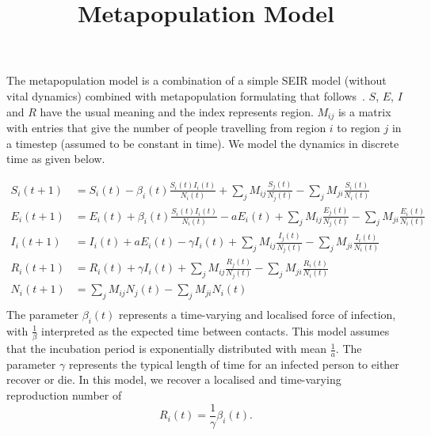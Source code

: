 \documentclass[10pt]{article}
\title{Metapopulation Model}
\begin{document}
\maketitle

The metapopulation model is a combination of a simple SEIR model (without vital dynamics)
combined with metapopulation formulating that follows~\cite{Li489}.
$S$, $E$, $I$ and $R$ have the usual meaning and the index represents region.
$M_{ij}$ is a matrix with entries that give the number of people travelling from region $i$ 
to region $j$ in a timestep (assumed to be constant in time).
We model the dynamics in discrete time as given below.

\begin{align*}
    S_i(t+1) &= S_i(t) -\beta_i(t)  \frac{S_i(t) I_i(t)}{N_i(t)} + \sum_{j} M_{ij} \frac{S_j(t)}{N_j(t)} - \sum_{j} M_{ji} \frac{S_i(t)}{N_i(t)}\\
    E_i(t+1) &= E_i(t) +\beta_i(t)  \frac{S_i(t) I_i(t) }{N_i(t)} - a E_i(t) + \sum_{j} M_{ij} \frac{E_j(t)}{N_j(t)} - \sum_{j} M_{ji} \frac{E_i(t)}{N_i(t)}\\
    I_i(t+1) &= I_i(t) + a E_i(t) - \gamma I_i(t) + \sum_{j} M_{ij} \frac{I_j(t)}{N_j(t)} - \sum_{j} M_{ji} \frac{I_i(t)}{N_i(t)}\\
    R_i(t+1) &= R_i(t) + \gamma I_i(t) + \sum_{j} M_{ij} \frac{R_j(t)}{N_j(t)} - \sum_{j} M_{ji} \frac{R_i(t)}{N_i(t)}\\
    N_i(t+1) &=  \sum_{j} M_{ij} N_j(t) - \sum_{j} M_{ji} N_i(t)\\
\end{align*}
The parameter $\beta_i(t)$ represents a time-varying and localised force of infection,
with $\frac{1}{\beta}$ interpreted as the expected time between contacts.
This model assumes that the incubation period is exponentially distributed
with mean $\frac{1}{a}$.
The parameter $\gamma$ represents the typical length of time for an infected person to 
either recover or die.
In this model, we recover a localised and time-varying reproduction number of
\[
    R_i(t) = \frac{1}{\gamma} \beta_i(t).
\]


\clearpage


\end{document}

